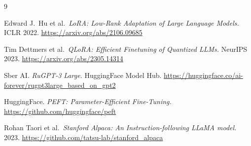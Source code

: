 \documentclass[12pt,a4paper]{article}
\begin{document}
\begin{thebibliography}{9}

Edward J.\ Hu et al.\ \textit{LoRA: Low-Rank Adaptation of Large Language Models.} ICLR 2022. \url{https://arxiv.org/abs/2106.09685}

Tim Dettmers et al.\ \textit{QLoRA: Efficient Finetuning of Quantized LLMs.} NeurIPS 2023. \url{https://arxiv.org/abs/2305.14314}

Sber AI. \textit{RuGPT-3 Large.} HuggingFace Model Hub. \url{https://huggingface.co/ai-forever/rugpt3large_based_on_gpt2}

HuggingFace. \textit{PEFT: Parameter-Efficient Fine-Tuning.} \url{https://github.com/huggingface/peft}

Rohan Taori et al.\ \textit{Stanford Alpaca: An Instruction-following LLaMA model.} 2023. \url{https://github.com/tatsu-lab/stanford_alpaca}

\end{thebibliography}
\end{document}
